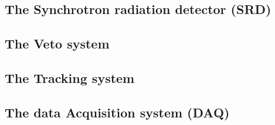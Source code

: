 \subsection{The Synchrotron radiation detector (SRD)}
\label{chapter2:sec:detectors-srd}

\subsection{The Veto system}
\label{chapter2:sec:detectors-veto}

\subsection{The Tracking system}
\label{chapter2:sec:detectors-tracking}

\subsection{The data Acquisition system (DAQ)}
\label{chapter2:sec:daq}

